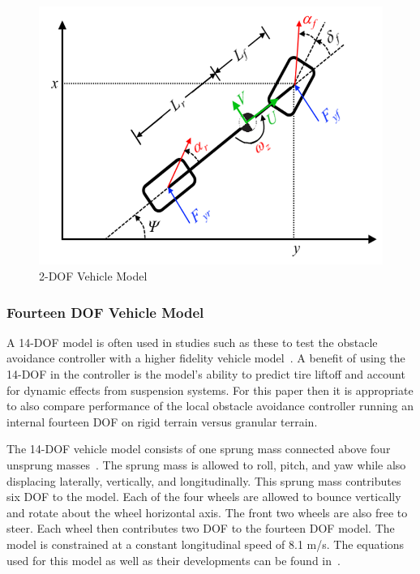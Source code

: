 \documentclass[12pt,twocolumn]{article}
\begin{document}
\begin{figure}
	\centering
	\includegraphics[width=1.0\columnwidth]{Figs/2DOF_haraus.png}
	\caption{\small 2-DOF Vehicle Model}  
	\label{fig:2DOF}
\end{figure}


\subsubsection{Fourteen DOF Vehicle Model}\label{sss:14DOFModel}
A 14-DOF model is often used in studies such as these to test the obstacle avoidance controller with a higher fidelity vehicle model~\cite{ModelFidelity2016, ModelFidelity2013}. A benefit of using the 14-DOF in the controller is the model’s ability to predict tire liftoff and account for dynamic effects from suspension systems. For this paper then it is appropriate to also compare performance of the local obstacle avoidance controller running an internal fourteen DOF on rigid terrain versus granular terrain.  

The 14-DOF vehicle model consists of one sprung mass connected above four unsprung masses~\cite{RollStudies2007}. The sprung mass is allowed to roll, pitch, and yaw while also displacing laterally, vertically, and longitudinally. This sprung mass contributes six DOF to the model. Each of the four wheels are allowed to bounce vertically and rotate about the wheel horizontal axis. The front two wheels are also free to steer. Each wheel then contributes two DOF to the fourteen DOF model. The model is constrained at a constant longitudinal speed of 8.1 m/s. The equations used for this model as well as their developments can be found in~\cite{RollStudies2007}.
\end{document}
